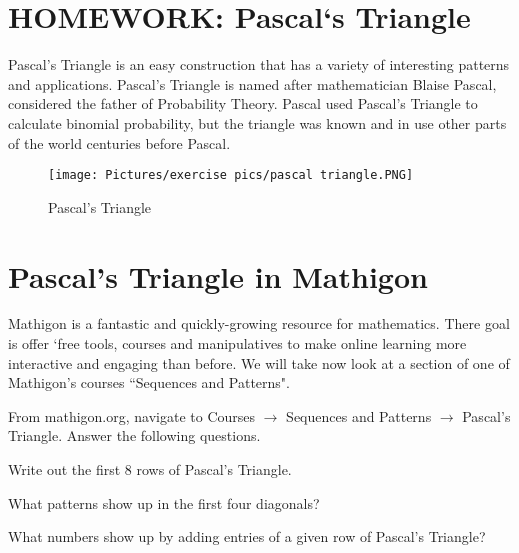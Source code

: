 
\section{HOMEWORK: Pascal`s Triangle}

Pascal's Triangle is an easy construction that has a variety of interesting patterns and applications. Pascal's Triangle is named after mathematician Blaise Pascal, considered the father of Probability Theory. Pascal used Pascal's Triangle to calculate binomial probability, but the triangle was known and in use other parts of the world centuries before Pascal.

\begin{figure}[h]
    \centering
    \texttt{[image: Pictures/exercise pics/pascal triangle.PNG]}
    \label{pascal_tri}
    \caption{Pascal's Triangle}
\end{figure}

\section{Pascal's Triangle in Mathigon}

Mathigon is a fantastic and quickly-growing resource for mathematics. There goal is offer `free tools, courses and manipulatives to make online learning more interactive and engaging than before. We will take now look at a section of one of Mathigon's courses ``Sequences and Patterns".

From mathigon.org, navigate to Courses $\rightarrow$ Sequences and Patterns $\rightarrow$ Pascal's Triangle. Answer the following questions.

\begin{exercise}
Write out the first 8 rows of Pascal’s Triangle.
\end{exercise}

\vspace{3in}

\begin{exercise}
What patterns show up in the first four diagonals?
\end{exercise}

\vspace{2in}

\begin{exercise}
What numbers show up by adding entries of a given row of Pascal’s Triangle?
\end{exercise}

